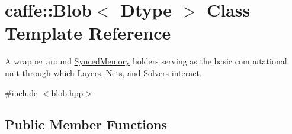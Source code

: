 \hypertarget{classcaffe_1_1_blob}{}\section{caffe\+:\+:Blob$<$ Dtype $>$ Class Template Reference}
\label{classcaffe_1_1_blob}


A wrapper around \mbox{\hyperlink{classcaffe_1_1_synced_memory}{Synced\+Memory}} holders serving as the basic computational unit through which \mbox{\hyperlink{classcaffe_1_1_layer}{Layer}}s, \mbox{\hyperlink{classcaffe_1_1_net}{Net}}s, and \mbox{\hyperlink{classcaffe_1_1_solver}{Solver}}s interact.  




{\ttfamily \#include $<$blob.\+hpp$>$}

\subsection*{Public Member Functions}
